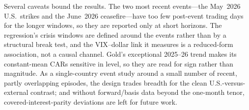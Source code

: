 Several caveats bound the results. The two most recent events---the May~2026 U.S.\ strikes
and the June~2026 ceasefire---have too few post-event trading days for the longer windows,
so they are reported only at short horizons. The regression's crisis windows are defined
around the events rather than by a structural break test, and the VIX--dollar link it
measures is a reduced-form association, not a causal channel. Gold's exceptional 2025--26
trend makes its constant-mean CARs
sensitive in level, so they are read for sign rather than magnitude. As a single-country
event study around a small number of recent, partly overlapping episodes, the design trades
breadth for the clean U.S.-versus-external contrast; and without forward/basis data beyond
the one-month tenor, covered-interest-parity deviations are left for future work.
